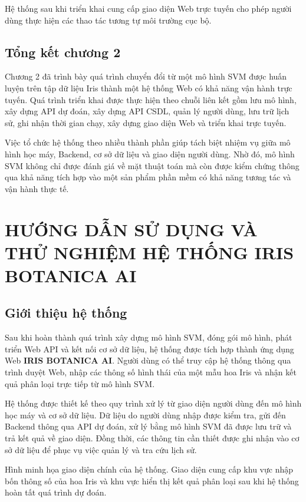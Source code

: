 \documentclass[14pt]{extarticle}
\begin{document}
	\noindent Hệ thống sau khi triển khai cung cấp giao diện Web trực tuyến cho phép người dùng thực hiện các thao tác tương tự môi trường cục bộ.
	\newpage
	
	\subsection{Tổng kết chương 2}
	
	\noindent Chương 2 đã trình bày quá trình chuyển đổi từ một mô hình SVM được huấn luyện trên tập dữ liệu Iris thành một hệ thống Web có khả năng vận hành trực tuyến. Quá trình triển khai được thực hiện theo chuỗi liên kết gồm lưu mô hình, xây dựng API dự đoán, xây dựng API CSDL, quản lý người dùng, lưu trữ lịch sử, ghi nhận thời gian chạy, xây dựng giao diện Web và triển khai trực tuyến.
	
	\noindent Việc tổ chức hệ thống theo nhiều thành phần giúp tách biệt nhiệm vụ giữa mô hình học máy, Backend, cơ sở dữ liệu và giao diện người dùng. Nhờ đó, mô hình SVM không chỉ được đánh giá về mặt thuật toán mà còn được kiểm chứng thông qua khả năng tích hợp vào một sản phẩm phần mềm có khả năng tương tác và vận hành thực tế.\\
	\newpage
	\section{HƯỚNG DẪN SỬ DỤNG VÀ THỬ NGHIỆM HỆ THỐNG IRIS BOTANICA AI}
	
	\subsection{Giới thiệu hệ thống}
	
	\noindent Sau khi hoàn thành quá trình xây dựng mô hình SVM, đóng gói mô hình, phát triển Web API và kết nối cơ sở dữ liệu, hệ thống được tích hợp thành ứng dụng Web \textbf{IRIS BOTANICA AI}. Người dùng có thể truy cập hệ thống thông qua trình duyệt Web, nhập các thông số hình thái của một mẫu hoa Iris và nhận kết quả phân loại trực tiếp từ mô hình SVM.
	
	\noindent Hệ thống được thiết kế theo quy trình xử lý từ giao diện người dùng đến mô hình học máy và cơ sở dữ liệu. Dữ liệu do người dùng nhập được kiểm tra, gửi đến Backend thông qua API dự đoán, xử lý bằng mô hình SVM đã được lưu trữ và trả kết quả về giao diện. Đồng thời, các thông tin cần thiết được ghi nhận vào cơ sở dữ liệu để phục vụ việc quản lý và tra cứu lịch sử.
	
	\noindent Hình minh họa giao diện chính của hệ thống. Giao diện cung cấp khu vực nhập bốn thông số của hoa Iris và khu vực hiển thị kết quả phân loại sau khi hệ thống hoàn tất quá trình dự đoán.
	
\end{document}
